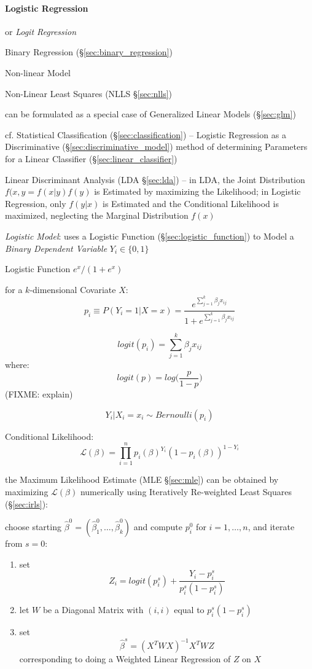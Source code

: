 \paragraph{Logistic Regression}\label{sec:logistic_regression}\hfill

or \emph{Logit Regression}

Binary Regression (\S\ref{sec:binary_regression})

Non-linear Model

Non-Linear Least Squares (NLLS \S\ref{sec:nlls})

can be formulated as a special case of Generalized Linear Models
(\S\ref{sec:glm})

cf. Statistical Classification (\S\ref{sec:classification}) -- Logistic
Regression as a Discriminative (\S\ref{sec:discriminative_model}) method of
determining Parameters for a Linear Classifier (\S\ref{sec:linear_classifier})

\fist Linear Discriminant Analysis (LDA \S\ref{sec:lda}) -- in LDA, the Joint
Distribution $f(x,y = f(x|y)f(y)$ is Estimated by maximizing the Likelihood; in
Logistic Regression, only $f(y|x)$ is Estimated and the Conditional Likelihood
is maximized, neglecting the Marginal Distribution $f(x)$

\emph{Logistic Model}: uses a Logistic Function (\S\ref{sec:logistic_function})
to Model a \emph{Binary Dependent Variable} $Y_i \in \{ 0, 1 \}$

Logistic Function $e^x / (1 + e^x)$

for a $k$-dimensional Covariate $X$:
\[
  p_i \equiv P(Y_i = 1 | X = x) = \frac{
    e^{\sum_{j=1}^k \beta_j x_{ij}}
  }{
    1 + e^{\sum_{j=1}^k \beta_j x_{ij}}
  }
\]

\[
  logit(p_i) = \sum_{j=1}^k \beta_j x_{ij}
\]
where:
\[
  logit(p) = log\Big(\frac{p}{1-p}\Big)
\]
(FIXME: explain)

\[
  Y_i | X_i = x_i \sim Bernoulli(p_i)
\]

Conditional Likelihood:
\[
  \mathcal{L}(\beta) = \prod_{i=1}^n p_i(\beta)^{Y_i} (1 - p_i(\beta))^{1-Y_i}
\]

the Maximum Likelihood Estimate (MLE \S\ref{sec:mle}) can be obtained by
maximizing $\mathcal{L}(\beta)$ numerically using Iteratively Re-weighted Least
Squares (\S\ref{sec:irls}):

choose starting $\hat{\beta}^0 = (\hat{\beta}_1^0, \ldots, \hat{\beta}_k^0)$
and compute $p_i^0$ for $i = 1, \ldots, n$, and iterate from $s = 0$:
\begin{enumerate}
  \item set
    \[
      Z_i = logit(p_i^s) + \frac{Y_i - p_i^s}{p_i^s(1 - p_i^s)}
    \]
  \item let $W$ be a Diagonal Matrix with $(i,i)$ equal to $p_i^s(1 - p_i^s)$
  \item set
    \[
      \hat{\beta}^s = (X^T W X)^{-1} X^T W Z
    \]
  corresponding to doing a Weighted Linear Regression of $Z$ on $X$
\end{enumerate}

